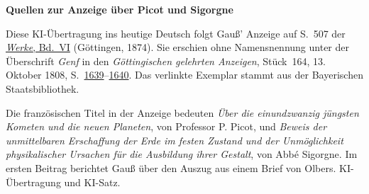 \clearpage\thispagestyle{empty}
\begin{center}\textbf{Quellen zur Anzeige über Picot und Sigorgne}\end{center}
\noindent Diese KI-Übertragung ins heutige Deutsch folgt Gauß’ Anzeige auf S.~507 der \href{https://gdz.sub.uni-goettingen.de/id/PPN236007467}{\textit{Werke}, Bd.~VI} (Göttingen, 1874). Sie erschien ohne Namensnennung unter der Überschrift \emph{Genf} in den \textit{Göttingischen gelehrten Anzeigen}, Stück~164, 13. Oktober 1808, S.~\href{https://api.digitale-sammlungen.de/iiif/image/v2/bsb10538674_00623/full/1800,/0/default.jpg}{1639}--\href{https://api.digitale-sammlungen.de/iiif/image/v2/bsb10538674_00624/full/1800,/0/default.jpg}{1640}. Das verlinkte Exemplar stammt aus der Bayerischen Staatsbibliothek.
\par\smallskip\noindent Die französischen Titel in der Anzeige bedeuten \emph{Über die einundzwanzig jüngsten Kometen und die neuen Planeten}, von Professor P. Picot, und \emph{Beweis der unmittelbaren Erschaffung der Erde im festen Zustand und der Unmöglichkeit physikalischer Ursachen für die Ausbildung ihrer Gestalt}, von Abbé Sigorgne. Im ersten Beitrag berichtet Gauß über den Auszug aus einem Brief von Olbers. KI-Übertragung und KI-Satz.
\clearpage
